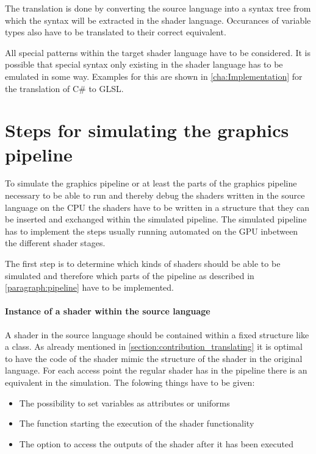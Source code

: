 The translation is done by converting the source language into a syntax tree from which the syntax will be extracted in the shader language. Occurances  of variable types also have to be translated to their correct equivalent.

All special patterns within the target shader language have to be considered. It is possible that special syntax only existing in the shader language has to be emulated in some way. Examples for this are shown in \autoref{cha:Implementation} for the translation of C\# to GLSL.

\section{Steps for simulating the graphics pipeline}
\label{section:contribution_simulating}

To simulate the graphics pipeline or at least the parts of the graphics pipeline necessary to be able to run and thereby debug the shaders written in the source language on the CPU the shaders have to be written in a structure that they can be inserted and exchanged within the simulated pipeline. The simulated pipeline has to implement the steps usually running automated on the GPU inbetween the different shader stages.

The first step is to determine which kinds of shaders should be able to be simulated and therefore which parts of the pipeline as described in \autoref{paragraph:pipeline} have to be implemented.

\paragraph{Instance of a shader within the source language}

A shader in the source language should be contained within a fixed structure like a class.
As already mentioned in \autoref{section:contribution_translating} it is optimal to have the code of the shader mimic the structure of the shader in the original language. For each access point the regular shader has in the pipeline there is an equivalent in the simulation. The folowing things have to be given:
\begin{itemize}
\item The possibility to set variables as attributes or uniforms
\item The function starting the execution of the shader functionality
\item The option to access the outputs of the shader after it has been executed
\end{itemize}

